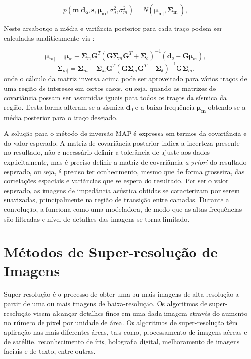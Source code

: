 \begin{equation}
p(\boldsymbol{m}|\boldsymbol{d_{o}},\boldsymbol{s},\boldsymbol{\mu_{m}},\sigma_{d}^{2},\sigma_{m}^{2}) = 
N(\boldsymbol{\mu_{m|}},\boldsymbol{\Sigma_{m|}}),
\end{equation} 

Neste arcabouço a média e variância posterior para cada traço podem ser
calculadas analiticamente via \citep{leandroGRSL}:

\begin{equation}
\label{eqn:mapSolution}
\boldsymbol{\mu}_{m|} = \boldsymbol{\mu}_{m} + \boldsymbol{\Sigma}_{m}\boldsymbol{G}^{T}(\boldsymbol{G\Sigma}_{m}\boldsymbol{G}^{T}+\boldsymbol{\Sigma}_{d})^{-1}\left ( \boldsymbol{d}_{o} - \boldsymbol{G\mu}_{m} \right ),
\end{equation}
\begin{equation}
\boldsymbol{\Sigma}_{m|} = \boldsymbol{\Sigma}_{m} - \boldsymbol{\Sigma}_{m}\boldsymbol{G}^{T}(\boldsymbol{G\Sigma}_{m}\boldsymbol{G}^{T}+\boldsymbol{\Sigma}_{d})^{-1}\boldsymbol{G\Sigma}_{m}.
\end{equation} 
onde o cálculo da matriz inversa acima pode ser aproveitado para vários traços
de uma região de interesse em certos casos, ou seja, quando as matrizes de
covariância possam ser assumidas iguais para todos os traços da sísmica da região.
Desta forma alteram-se a sísmica $\mathbf{d}_0$ e a baixa frequência
$\boldsymbol{\mu_m}$ obtendo-se a média posterior para o traço desejado.
  
% 
A solução para o método de inversão MAP é expressa em termos da covariância
e do valor esperado. 
A matriz de covariância posterior indica a incerteza presente no resultado, não é necessário
definir a tolerância de ajuste aos dados explicitamente, mas é preciso definir a
matriz de covariância \textit{a priori} do resultado esperado, ou seja, é
preciso ter conhecimento, mesmo que de forma grosseira, das correlações espaciais e
variâncias que se espera do resultado.
Por ser o valor esperado, as imagens de impedância acústica obtidas
se caracterizam por serem suavizadas, principalmente na região de
transição entre camadas. Durante a convolução, a  funciona
como uma modeladora, de modo que as altas frequências são filtradas
e nível de detalhes das imagens se torna limitado. 

\section{Métodos de Super-resolução de Imagens}
Super-resolução é o processo de obter uma ou mais imagens de alta
resolução a partir de uma ou mais imagens de baixa-resolução.
Os algoritmos de super-resolução visam alcançar detalhes finos
em uma dada imagem através do aumento no número de pixel por unidade
de área. Os algoritmos de super-resolução têm aplicação nas mais diferentes áreas,
tais como, processamento de imagens aéreas e de satélite, reconhecimento de
íris, holografia digital, melhoramento de imagens faciais e de texto, entre
outras.

